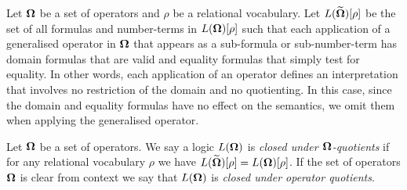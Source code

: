 \documentclass[../main/thesis.tex]{subfiles}
\begin{document}


Let $\mathbf{\mathbf{\Omega}}$ be a set of operators and $\rho$ be a relational vocabulary. Let
$L(\widetilde{\mathbf{\mathbf{\Omega}}})[\rho]$ be the set of all formulas and number-terms in
$L(\mathbf{\mathbf{\Omega}})[\rho]$ such that each application of a generalised operator in
$\mathbf{\mathbf{\Omega}}$ that appears as a sub-formula or sub-number-term has domain formulas
that are valid and equality formulas that simply test for equality. In other
words, each application of an operator defines an interpretation that involves
no restriction of the domain and no quotienting. In this case, since the domain
and equality formulas have no effect on the semantics, we omit them when
applying the generalised operator.

\begin{definition}
  Let $\mathbf{\mathbf{\Omega}}$ be a set of operators. We say a logic $L(\mathbf{\mathbf{\Omega}})$ is \emph{closed
    under $\mathbf{\mathbf{\Omega}}$-quotients} if for any relational vocabulary $\rho$ we have
  $L(\widetilde{\mathbf{\mathbf{\Omega}}})[\rho] = L(\mathbf{\mathbf{\Omega}})[\rho]$. If the set of operators
  $\mathbf{\mathbf{\Omega}}$ is clear from context we say that $L(\mathbf{\mathbf{\Omega}})$ is \emph{closed under
    operator quotients}.
\end{definition}
\end{document}
